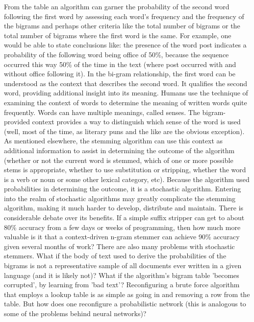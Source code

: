 From the table an algorithm can garner the probability of the second word following the first word by assessing each word's frequency and the frequency of the bigrams and perhaps other criteria like the total number of bigrams or the total number of bigrams where the first word is the same. For example, one would be able to state conclusions like: the presence of the word post indicates a probability of the following word being office of 50\%, because the sequence occurred this way 50\% of the time in the text (where post occurred with and without office following it).  In the bi-gram relationship, the first word can be understood as the context that describes the second word. It qualifies the second word, providing additional insight into its meaning. Humans use the technique of examining the context of words to determine the meaning of written words quite frequently. Words can have multiple meanings, called senses. The bigram-provided context provides a way to distinguish which sense of the word is used (well, most of the time, as literary puns and the like are the obvious exception). As mentioned elsewhere, the stemming algorithm can use this context as additional information to assist in determining the outcome of the algorithm (whether or not the current word is stemmed, which of one or more possible stems is appropriate, whether to use substitution or stripping, whether the word is a verb or noun or some other lexical category, etc). Because the algorithm used probabilities in determining the outcome, it is a stochastic algorithm.
Entering into the realm of stochastic algorithms may greatly complicate the stemming algorithm, making it much harder to develop, distribute and maintain. There is considerable debate over its benefits. If a simple suffix stripper can get to about 80\% accuracy from a few days or weeks of programming, then how much more valuable is it that a context-driven n-gram stemmer can achieve 90\% accuracy given several months of work? There are also many problems with stochastic stemmers. What if the body of text used to derive the probabilities of the bigrams is not a representative sample of all documents ever written in a given language (and it is likely not)? What if the algorithm's bigram table 'becomes corrupted', by learning from 'bad text'? Reconfiguring a brute force algorithm that employs a lookup table is as simple as going in and removing a row from the table. But how does one reconfigure a probabilistic network (this is analogous to some of the problems behind neural networks)?

